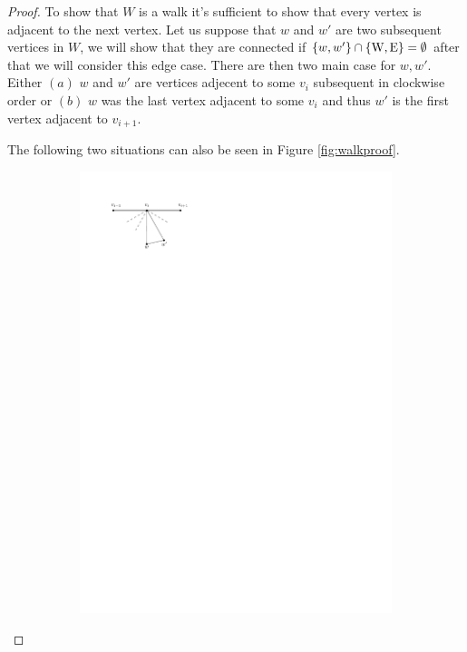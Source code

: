 \begin{proof}
To show that $W$ is a walk it's sufficient to show that every vertex is adjacent to the next vertex. Let us suppose that $w$ and $w'$ are two subsequent vertices in $W$, we will show that they are connected if $\left\lbrace {w, w'} \right\rbrace \cap \left\lbrace {\mathrm{W}, \mathrm{E}} \right\rbrace = \emptyset$ after that we will consider this edge case. There are then two main case for $w, w'$. Either $(a)$ $w$ and $w'$ are  vertices adjecent to some $v_i$ subsequent in clockwise order or $(b)$ $w$ was the last vertex adjacent to some $v_i$ and thus $w'$ is the first vertex adjacent to $v_{i+1}$.

The following two situations can also be seen in Figure \ref{fig:walkproof}.

\begin{figure}
    \centering
    \begin{subfigure}[b]{0.5\linewidth}
        \includegraphics[width=\linewidth]{img/walkProofA}

\end{subfigure}
\end{figure}
\end{proof}
